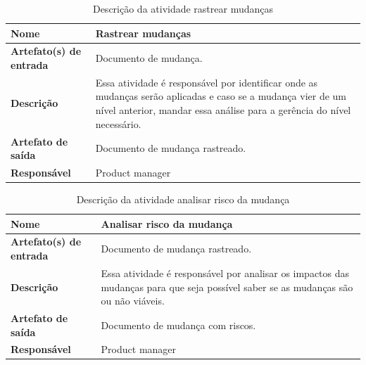     \begin{table}[H]
        \centering
        \label{descricaoAtividades25}
        \caption{Descrição da atividade rastrear mudanças}
            \begin{tabular}{|l|p{10cm}|}
            \hline
            \textbf{Nome} & Rastrear mudanças \\
            \hline
            \textbf{Artefato(s) de entrada} & Documento de mudança. \\
            \hline
            \textbf{Descrição} & Essa atividade é responsável por identificar onde as mudanças serão aplicadas e caso se a mudança vier de um nível anterior, mandar essa análise para a gerência do nível necessário. \\
            \hline
            \textbf{Artefato de saída} & Documento de mudança rastreado. \\
            \hline
            \textbf{Responsável} & Product manager \\
            \hline
        \end{tabular}
    \end{table}

    \begin{table}[H]
        \centering
        \label{descricaoAtividades26}
        \caption{Descrição da atividade analisar risco da mudança}
            \begin{tabular}{|l|p{10cm}|}
            \hline
            \textbf{Nome} & Analisar risco da mudança \\
            \hline
            \textbf{Artefato(s) de entrada} & Documento de mudança rastreado. \\
            \hline
            \textbf{Descrição} & Essa atividade é responsável por analisar os impactos das mudanças para que seja possível saber se as mudanças são ou não viáveis. \\
            \hline
            \textbf{Artefato de saída} & Documento de mudança com riscos. \\
            \hline
            \textbf{Responsável} & Product manager \\
            \hline
        \end{tabular}
    \end{table}

